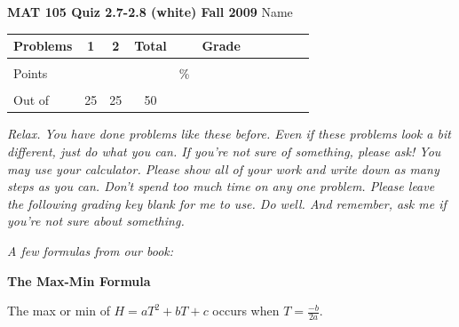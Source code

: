 \documentclass[11pt]{article}
\begin{document}
{\bf MAT 105 Quiz 2.7-2.8 (white) Fall 2009} \hspace{.4in} {\large Name} \hrulefill

\hrulefill


\begin{center}

\begin{tabular}
{|l|c|c|c|c|c|c|c|c|c|c|} \hline

 Problems & \hspace{5 pt} 1 \hspace{5 pt}  & \hspace{5 pt} 2 \hspace{5 pt} &  \hspace{5 pt} Total  \hspace{5 pt} & &  \hspace{5 pt} Grade \hspace{5 pt}  \\ \hline
&&& &&\\  
Points &&& &    \hspace{.8in}\% &  \\ 
&&& && \\  \hline
Out of & 25 & 25  &50 & & \\ \hline

\end {tabular}
 
\end{center}

 \emph{Relax.  You have done problems like these before.  Even if these problems look a bit different, just do what you can.  If you're not sure of something, please ask! You may use your calculator.  Please show all of your work and write down as many steps as you can.  Don't spend too much time on any one problem.  Please leave the following grading key blank for me to use.  Do well.  And remember, ask me if you're not sure about something.}
 
 \vspace{.1in}
 
 \emph{A few formulas from our book:}
  \vspace{.2in}
 
  \begin{center}
\textbf{The Max-Min Formula}
\vspace{.1in}

The max or min of $H=aT^2+bT+c$ occurs when $\displaystyle T=\frac{-b}{2a}$.

 \end{center}
 
\end{document}

